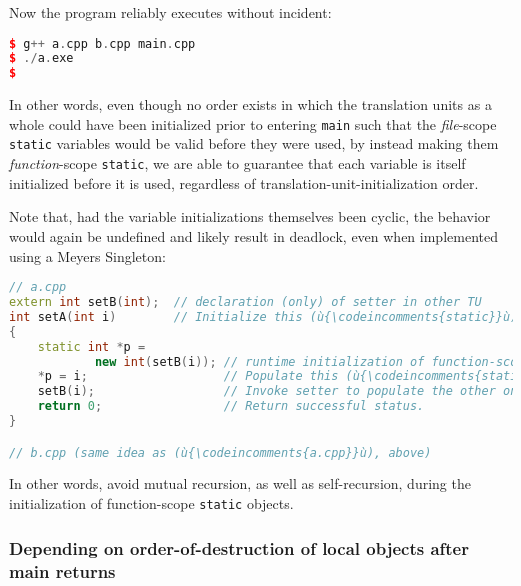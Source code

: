 \noindent Now the program reliably executes without incident:

\begin{lstlisting}[language=C++]
$ g++ a.cpp b.cpp main.cpp
$ ./a.exe
$
\end{lstlisting}
    
\noindent In other words, even though no order exists in which the translation
units as a whole could have been initialized prior to entering
\lstinline!main! such that the \emph{file}-scope \lstinline!static! variables
would be valid before they were used, by instead making them
\emph{function}-scope \lstinline!static!, we are able to guarantee that
each variable is itself initialized before it is used, regardless of
translation-unit-initialization order.

Note that, had the variable initializations themselves been cyclic, the
behavior would again be undefined and likely result in deadlock, even
when implemented using a Meyers Singleton:

\begin{lstlisting}[language=C++]
// a.cpp
extern int setB(int);  // declaration (only) of setter in other TU
int setA(int i)        // Initialize this (ù{\codeincomments{static}}ù) variable to that one.
{
    static int *p =
            new int(setB(i)); // runtime initialization of function-scope (ù{\codeincomments{static}}ù)
    *p = i;                   // Populate this (ù{\codeincomments{static}}ù)-owned heap memory.
    setB(i);                  // Invoke setter to populate the other one.
    return 0;                 // Return successful status.
}

// b.cpp (same idea as (ù{\codeincomments{a.cpp}}ù), above)
\end{lstlisting}
    
\noindent In other words, avoid mutual recursion, as well as self-recursion,
during the initialization of function-scope \lstinline!static! objects.

\subsubsection[Depending on order-of-destruction of local objects after \tt{main} returns]{Depending on order-of-destruction of local objects after {\ParaCode main} returns}\label{depending-on-order-of-destruction-of-local-objects-after-main-returns}


